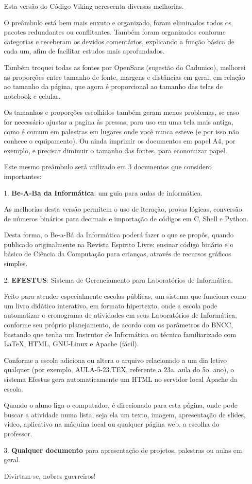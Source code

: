 \begin{multicols}{2}
	{\normalsize
		Esta versão do Código Viking acrescenta diversas melhorias.
		
		O preâmbulo está bem mais enxuto e organizado, foram eliminados todos os pacotes redundantes ou conflitantes. Também foram organizados conforme categorias e receberam os devidos comentários, explicando a função básica de cada um, afim de facilitar estudos mais aprofundados.
		
		Também troquei todas as fontes por OpenSans (sugestão do Cadunico), melhorei as proporções entre tamanho de fonte, margens e distâncias em geral, em relação ao tamanho da página, que agora é proporcional ao tamanho das telas de notebook e celular.
		
		Os tamanhos e proporções escolhidos também geram menos problemas, se caso for necessário ajustar a pagina às pressas, para uso em uma tela mais antiga, como é comum em palestras em lugares onde você nunca esteve (e por isso não conhece o equipamento). Ou ainda imprimir os documentos em papel A4, por exemplo, e precisar diminuir o tamanho das fontes, para economizar papel.
		
		Este mesmo preâmbulo será utilizado em 3 documentos que considero importantes: 
		
		1. \textbf{Be-A-Ba da Informática}: um guia para aulas de informática.
		
		As melhorias desta versão permitem o uso de iteração, provas lógicas, conversão de números binários para decimais e importação de códigos em C, Shell e Python.
		
		Desta forma, o Be-a-Bá da  Informática poderá fazer o que se propôs, quando publicado originalmente na Revista Espirito Livre: ensinar código binário e o básico de Ciência da Computação para crianças, através de recursos gráficos simples.
		
		2.\textbf{ EFESTUS}: Sistema de Gerenciamento para Laboratórios de Informática.
		
		Feito para atender especialmente escolas públicas, um sistema que funciona como um livro didático interativo, em formato hipertexto, onde a escola pode automatizar o cronograma de atividades em seus Laboratórios de Informática, conforme seu próprio planejamento, de acordo com os parâmetros do BNCC, bastando que tenha um Instrutor de Informática ou técnico familiarizado com LaTeX, HTML, GNU-Linux e Apache (fácil).
		
		Conforme a escola adiciona ou altera o arquivo relacionado a um dia letivo qualquer (por exemplo, AULA-5-23.TEX, referente a 23a. aula do 5o. ano), o sistema Efestus gera automaticamente um HTML no servidor local Apache da escola.
		
		Quando o aluno liga o computador, é direcionado para esta página, onde pode buscar a atividade numa lista, seja ela um texto, imagem, apresentação de slides, video, aplicativo na máquina local ou qualquer página web, a escolha do professor.
		
		3. \textbf{Qualquer documento} para apresentação de projetos, palestras ou aulas em geral.
		
		Divirtam-se, nobres guerreiros!}
\end{multicols}

\null
\pagebreak
